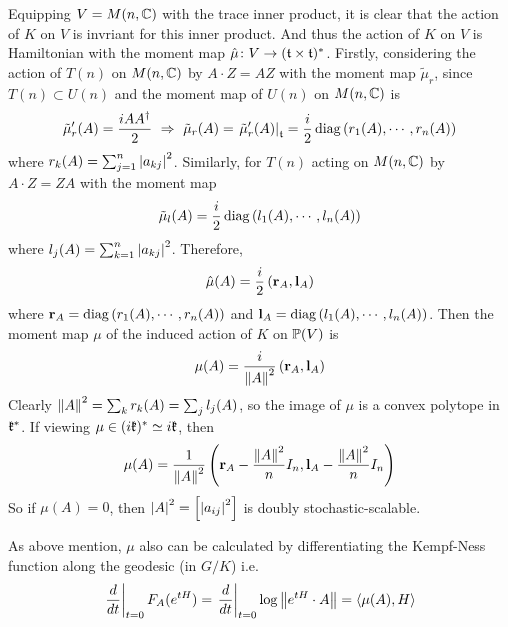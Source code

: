 \documentclass[a4paper,12pt]{article}
\begin{document}
\begin{enumerate}
		Equipping $V=M(n,\mathbb{C})$ with the trace inner product, it is clear that the action of $K$ on $V$ is invriant for this inner product. And thus the action of $K$ on $V$ is Hamiltonian with the moment map $\hat{\mu} \colon V \rightarrow (\mathfrak{t} \times \mathfrak{t})^*$. Firstly, considering the action of $T(n)$ on $M(n,\mathbb{C})$ by $A \cdot Z = AZ$ with the moment map $\tilde{\mu}_r$, since $T(n) \subset U(n)$ and the moment map of $U(n)$ on $M(n,\mathbb{C})$ is 
		\begin{equation*}
			\tilde{\mu}_r^{\prime}(A) = \frac{iAA^{\dagger}}{2}~\Rightarrow~ \tilde{\mu}_r(A) = \left.\tilde{\mu}_r^{\prime}(A)\right\lvert_{\mathfrak{t}} = \frac{i}{2} \operatorname{diag}\left(r_1(A),\cdots,r_n(A)\right)
		\end{equation*}
		where $r_k(A) = \sum_{j=1}^n\left\lvert a_{kj}\right\lvert^2$. Similarly, for $T(n)$ acting on $M(n,\mathbb{C})$ by $A \cdot Z = ZA$ with the moment map \begin{equation*}
			\tilde{\mu}_l(A) = \frac{i}{2} \operatorname{diag}\left(l_1(A),\cdots,l_n(A)\right)
		\end{equation*}
		where $l_j(A) = \sum_{k=1}^n\left\lvert a_{kj}\right\lvert^2$. Therefore, 
		\begin{equation*}
			\hat{\mu}(A) = \frac{i}{2}\left(\mathbf{r}_A,\mathbf{l}_A\right)
		\end{equation*}
		where $\mathbf{r}_A = \operatorname{diag}\left(r_1(A),\cdots,r_n(A)\right)$ and $\mathbf{l}_A = \operatorname{diag}\left(l_1(A),\cdots,l_n(A)\right)$. Then the moment map $\mu$ of the induced action of $K$ on $\mathbb{P}(V)$ is
		\begin{equation*}
			\mu(A) = \frac{i}{\left\lVert A\right\lVert^2}\left(\mathbf{r}_A,\mathbf{l}_A\right)
		\end{equation*}
		Clearly $\left\lVert A\right\lVert^2 =\sum_k r_k(A) = \sum_j l_j(A)$, so the image of $\mu$ is a convex polytope in $\mathfrak{k}^*$. If viewing $\mu \in (i\mathfrak{k})^* \simeq i \mathfrak{k}$, then
		\begin{equation*}
			\mu(A) = \frac{1}{\left\lVert A\right\lVert^2}\left(\mathbf{r}_A-\frac{\left\lVert A\right\lVert^2}{n}I_n,\mathbf{l}_A-\frac{\left\lVert A\right\lVert^2}{n}I_n\right)
		\end{equation*}
		So if $\mu(A) = 0$, then $\left\lvert A\right\lvert^2 = \left[\left\lvert a_{ij}\right\lvert^2\right]$ is doubly stochastic-scalable.
	\end{enumerate}
	\begin{rem}
		As above mention, $\mu$ also can be calculated by differentiating the Kempf-Ness function along the geodesic (in $G/K$) i.e.
		\begin{equation*}
			\left.\frac{d}{dt}\right\lvert_{t=0}F_A(e^{tH}) = \left.\frac{d}{dt}\right\lvert_{t=0}\log \left\lVert e^{tH} \cdot A\right\lVert = \left\langle \mu(A),H \right\rangle
		\end{equation*}
	\end{rem}
\end{document}
